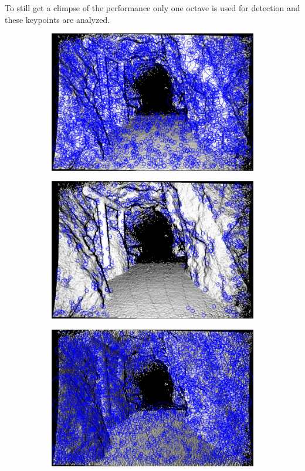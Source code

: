 To still get a climpse of the performance only one octave is used for detection and these keypoints are analyzed.
\begin{figure}[H]
\begin{subfigure}[t]{0.25\linewidth}
    \includegraphics[width=\linewidth]{chapter06/results/SURF/flexion/default_kp0005.png}%
\end{subfigure}%
\begin{subfigure}[t]{0.25\linewidth}
    \includegraphics[width=\linewidth]{chapter06/results/SURF/flexion/oneoctave_kp0005.png}%
\end{subfigure}%
\begin{subfigure}[t]{0.25\linewidth}
    \includegraphics[width=\linewidth]{chapter06/results/SURF/bearing/default_kp0005.png}%

\end{subfigure}
\end{figure}
